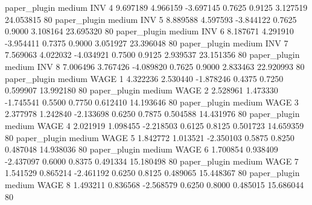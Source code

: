   paper_plugin     medium      INV                 4  9.697189 4.966159 -3.697145 0.7625 0.9125  3.127519   24.053815 80
  paper_plugin     medium      INV                 5  8.889588 4.597593 -3.844122 0.7625 0.9000  3.108164   23.695320 80
  paper_plugin     medium      INV                 6  8.187671 4.291910 -3.954411 0.7375 0.9000  3.051927   23.396048 80
  paper_plugin     medium      INV                 7  7.569063 4.022032 -4.034921 0.7500 0.9125  2.939537   23.151356 80
  paper_plugin     medium      INV                 8  7.006496 3.767426 -4.089820 0.7625 0.9000  2.833463   22.920993 80
  paper_plugin     medium     WAGE                 1  4.322236 2.530440 -1.878246 0.4375 0.7250  0.599907   13.992180 80
  paper_plugin     medium     WAGE                 2  2.528961 1.473330 -1.745541 0.5500 0.7750  0.612410   14.193646 80
  paper_plugin     medium     WAGE                 3  2.377978 1.242840 -2.133698 0.6250 0.7875  0.504588   14.431976 80
  paper_plugin     medium     WAGE                 4  2.021919 1.098455 -2.218503 0.6125 0.8125  0.501723   14.659359 80
  paper_plugin     medium     WAGE                 5  1.842772 1.013521 -2.350103 0.5875 0.8250  0.487048   14.938036 80
  paper_plugin     medium     WAGE                 6  1.700854 0.938409 -2.437097 0.6000 0.8375  0.491334   15.180498 80
  paper_plugin     medium     WAGE                 7  1.541529 0.865214 -2.461192 0.6250 0.8125  0.489065   15.448367 80
  paper_plugin     medium     WAGE                 8  1.493211 0.836568 -2.568579 0.6250 0.8000  0.485015   15.686044 80